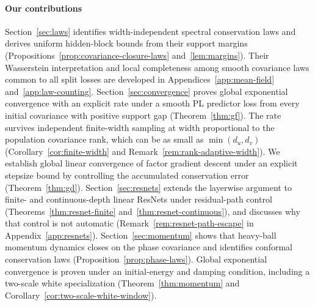 \paragraph{Our contributions}
Section~\ref{sec:laws} identifies width-independent spectral conservation
laws and derives uniform hidden-block bounds from their support margins
(Propositions~\ref{prop:covariance-closure-laws} and~\ref{lem:margins}).
Their Wasserstein interpretation and local completeness among smooth covariance
laws common to all split losses are developed in
Appendices~\ref{app:mean-field} and~\ref{app:law-counting}.
Section~\ref{sec:convergence} proves global exponential convergence with an explicit rate under a smooth PL predictor loss from every initial covariance with positive
support gap (Theorem~\ref{thm:gf}).
The rate survives independent finite-width sampling at width proportional to the population covariance rank, which can be
as small as $\min(d_u,d_v)$ (Corollary~\ref{cor:finite-width} and
Remark~\ref{rem:rank-adaptive-width}).
We establish global linear convergence of factor
gradient descent under an explicit stepsize bound by controlling the
accumulated conservation error (Theorem~\ref{thm:gd}).
Section~\ref{sec:resnets} extends the layerwise argument to finite- and
continuous-depth linear ResNets under residual-path control
(Theorems~\ref{thm:resnet-finite} and~\ref{thm:resnet-continuous}), and
discusses why that control is not automatic (Remark~\ref{rem:resnet-path-escape}
in Appendix~\ref{app:resnets}).
Section~\ref{sec:momentum} shows that heavy-ball momentum dynamics closes on the phase covariance and identifies conformal conservation laws (Proposition~\ref{prop:phase-laws}).
Global exponential convergence is proven under an initial-energy
and damping condition, including a two-scale white specialization
(Theorem~\ref{thm:momentum} and Corollary~\ref{cor:two-scale-white-window}).

